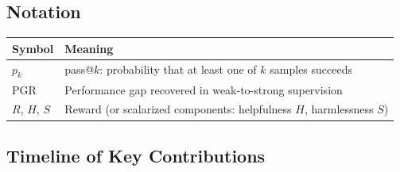 \subsection*{Notation}

\begin{center}
\begin{tabularx}{\textwidth}{@{}lX@{}}
\toprule
Symbol & Meaning \\
\midrule
$p_k$ & pass@$k$: probability that at least one of $k$ samples succeeds \\
$\text{PGR}$ & Performance gap recovered in weak-to-strong supervision \\
$R$, $H$, $S$ & Reward (or scalarized components: helpfulness $H$, harmlessness $S$) \\
\bottomrule
\end{tabularx}
\end{center}

\subsection*{Timeline of Key Contributions}

